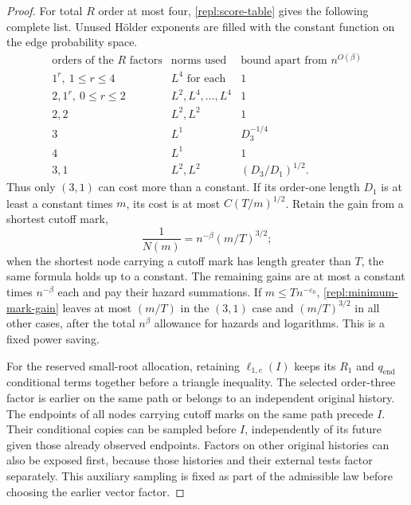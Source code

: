 \begin{proof}
For total $R$ order at most four, \eqref{repl:score-table} gives the
following complete list.  Unused H\"older exponents are filled with the
constant function on the edge probability space.
\begin{equation}\label{repl:low-patterns}
\begin{array}{c|c|c}
\text{orders of the }R\text{ factors}&\text{norms used}
   &\text{bound apart from }n^{O(\beta)}\\ \hline
1^r,\ 1\le r\le4& L^4\text{ for each}&1\\
2,1^r,\ 0\le r\le2&L^2,L^4,\ldots,L^4&1\\
2,2&L^2,L^2&1\\
3&L^1&D_3^{-1/4}\\
4&L^1&1\\
3,1&L^2,L^2&(D_3/D_1)^{1/2}.
\end{array}
\end{equation}
Thus only $(3,1)$ can cost more than a constant.  If its order-one length
$D_1$ is at least a constant times $m$, its cost is at most
$C(T/m)^{1/2}$.  Retain the gain from a shortest cutoff mark,
\begin{equation}\label{repl:minimum-mark-gain}
 \frac1{N(m)}=n^{-\beta}(m/T)^{3/2};
\end{equation}
when the shortest node carrying a cutoff mark has length greater than $T$,
the same formula holds up to a constant.  The remaining gains are at most a constant times
$n^{-\beta}$ each and pay their hazard summations.
If $m\le Tn^{-\varepsilon_0}$,
\eqref{repl:minimum-mark-gain} leaves at most $(m/T)$ in the $(3,1)$
case and $(m/T)^{3/2}$ in all other cases, after the total $n^\beta$
allowance for hazards and logarithms.  This is a fixed power saving.

For the reserved small-root allocation, retaining $\ell_{1,e}(I)$ keeps its
$R_1$ and $q_{\mathrm{end}}$ conditional terms together before a triangle
inequality.  The selected order-three factor is earlier on the same path or
belongs to an independent original history.  The endpoints of all nodes carrying
cutoff marks on the same path precede $I$.  Their conditional copies can be
sampled before $I$, independently of its future given those already observed
endpoints.  Factors on other original histories can also be exposed first,
because those histories and their external tests factor separately.  This
auxiliary sampling is fixed as part of the admissible law before choosing
the earlier vector factor.


\end{proof}
